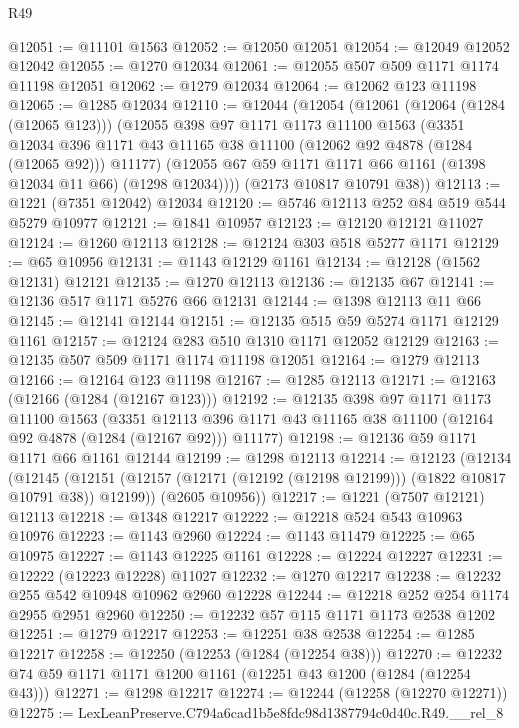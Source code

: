 \begin{lexlean}{R49}
\begin{coremodule}
@12051 := @11101 @1563
@12052 := @12050 @12051
@12054 := @12049 @12052 @12042
@12055 := @1270 @12034
@12061 := @12055 @507 @509 @1171 @1174 @11198 @12051
@12062 := @1279 @12034
@12064 := @12062 @123 @11198
@12065 := @1285 @12034
@12110 := @12044
    (@12054
      (@12061
        (@12064 (@1284 (@12065 @123)))
        (@12055
          @398
          @97
          @1171
          @1173
          @11100
          @1563
          (@3351
            @12034
            @396
            @1171
            @43
            @11165
            @38
            @11100
            (@12062 @92 @4878 (@1284 (@12065 @92)))
            @11177)
          (@12055 @67 @59 @1171 @1171 @66 @1161 (@1398 @12034 @11 @66) (@1298 @12034))))
      (@2173 @10817 @10791 @38))
@12113 := @1221 (@7351 @12042) @12034
@12120 := @5746 @12113 @252 @84 @519 @544 @5279 @10977
@12121 := @1841 @10957
@12123 := @12120 @12121 @11027
@12124 := @1260 @12113
@12128 := @12124 @303 @518 @5277 @1171
@12129 := @65 @10956
@12131 := @1143 @12129 @1161
@12134 := @12128 (@1562 @12131) @12121
@12135 := @1270 @12113
@12136 := @12135 @67
@12141 := @12136 @517 @1171 @5276 @66 @12131
@12144 := @1398 @12113 @11 @66
@12145 := @12141 @12144
@12151 := @12135 @515 @59 @5274 @1171 @12129 @1161
@12157 := @12124 @283 @510 @1310 @1171 @12052 @12129
@12163 := @12135 @507 @509 @1171 @1174 @11198 @12051
@12164 := @1279 @12113
@12166 := @12164 @123 @11198
@12167 := @1285 @12113
@12171 := @12163 (@12166 (@1284 (@12167 @123)))
@12192 := @12135
    @398
    @97
    @1171
    @1173
    @11100
    @1563
    (@3351 @12113 @396 @1171 @43 @11165 @38 @11100 (@12164 @92 @4878 (@1284 (@12167 @92))) @11177)
@12198 := @12136 @59 @1171 @1171 @66 @1161 @12144
@12199 := @1298 @12113
@12214 := @12123
    (@12134
      (@12145 (@12151 (@12157 (@12171 (@12192 (@12198 @12199))) (@1822 @10817 @10791 @38)) @12199))
      (@2605 @10956))
@12217 := @1221 (@7507 @12121) @12113
@12218 := @1348 @12217
@12222 := @12218 @524 @543 @10963 @10976
@12223 := @1143 @2960
@12224 := @1143 @11479
@12225 := @65 @10975
@12227 := @1143 @12225 @1161
@12228 := @12224 @12227
@12231 := @12222 (@12223 @12228) @11027
@12232 := @1270 @12217
@12238 := @12232 @255 @542 @10948 @10962 @2960 @12228
@12244 := @12218 @252 @254 @1174 @2955 @2951 @2960
@12250 := @12232 @57 @115 @1171 @1173 @2538 @1202
@12251 := @1279 @12217
@12253 := @12251 @38 @2538
@12254 := @1285 @12217
@12258 := @12250 (@12253 (@1284 (@12254 @38)))
@12270 := @12232 @74 @59 @1171 @1171 @1200 @1161 (@12251 @43 @1200 (@1284 (@12254 @43)))
@12271 := @1298 @12217
@12274 := @12244 (@12258 (@12270 @12271))
@12275 := LexLeanPreserve.C794a6cad1b5e8fdc98d1387794c0d40c.R49.__rel_8

\end{coremodule}
\end{lexlean}
